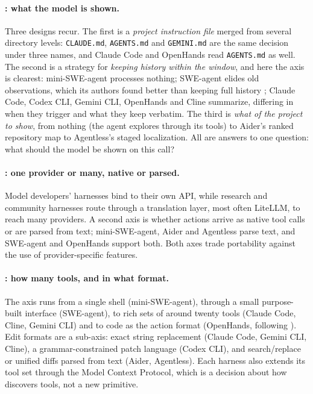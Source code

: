 \paragraph{: what the model is shown.} Three designs recur. The first is a \emph{project instruction file} merged from several directory levels: \texttt{CLAUDE.md}, \texttt{AGENTS.md} and \texttt{GEMINI.md} are the same decision under three names, and Claude Code and OpenHands read \texttt{AGENTS.md} as well. The second is a strategy for \emph{keeping history within the window}, and here the axis is clearest: mini-SWE-agent processes nothing; SWE-agent elides old observations, which its authors found better than keeping full history \citep{yang2024sweagent}; Claude Code, Codex CLI, Gemini CLI, OpenHands and Cline summarize, differing in when they trigger and what they keep verbatim. The third is \emph{what of the project to show}, from nothing (the agent explores through its tools) to Aider's ranked repository map to Agentless's staged localization. All are answers to one question: what should the model be shown on this call?

\paragraph{: one provider or many, native or parsed.} Model developers' harnesses bind to their own API, while research and community harnesses route through a translation layer, most often LiteLLM, to reach many providers. A second axis is whether actions arrive as native tool calls or are parsed from text; mini-SWE-agent, Aider and Agentless parse text, and SWE-agent and OpenHands support both. Both axes trade portability against the use of provider-specific features.

\paragraph{: how many tools, and in what format.} The axis runs from a single shell (mini-SWE-agent), through a small purpose-built interface (SWE-agent), to rich sets of around twenty tools (Claude Code, Cline, Gemini CLI) and to code as the action format (OpenHands, following \citet{wang2024codeact}). Edit formats are a sub-axis: exact string replacement (Claude Code, Gemini CLI, Cline), a grammar-constrained patch language (Codex CLI), and search/replace or unified diffs parsed from text (Aider, Agentless). Each harness also extends its tool set through the Model Context Protocol, which is a decision about how  discovers tools, not a new primitive.

